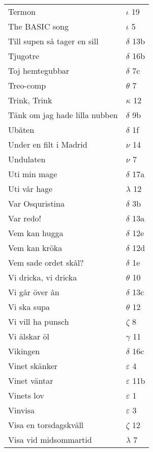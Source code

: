 \documentclass[a6paper,10pt]{article}
\begin{document}
\newpage
\begin{table}[!h]
\begin{tabular}{l l}
Termon&	$\iota$ 19\\
The BASIC song	&$\iota$ 5\\
Till supen så tager en sill	&$\delta$ 13b\\
Tjugotre	&$\delta$ 16b\\
Toj hemtegubbar	&$\delta$ 7c\\
Treo-comp	&$\theta$ 7\\
Trink, Trink&	$\kappa$ 12\\
Tänk om jag hade lilla nubben&	$\delta$ 9b\\
Ubåten	&$\delta$ 1f\\
Under en filt i Madrid	&$\nu$ 14\\
Undulaten&	$\nu$ 7\\
Uti min mage	&$\delta$ 17a\\
Uti vår hage	&$\lambda$ 12\\
Var Osquristina	&$\delta$ 3b\\
Var redo!	&$\delta$ 13a\\
Vem kan hugga	&$\delta$ 12e\\
Vem kan kröka	&$\delta$ 12d\\
Vem sade ordet skål?	&$\delta$ 1e\\
Vi dricka, vi dricka&	$\theta$ 10\\
Vi går över ån	&$\delta$ 13c\\
Vi ska supa	&$\theta$ 12\\
Vi vill ha punsch	&$\zeta$ 8\\
Vi älskar öl	&$\gamma$ 11\\
Vikingen	&$\delta$ 16c\\
Vinet skänker	&$\varepsilon$ 4\\
Vinet väntar	&$\varepsilon$ 11b\\
Vinets lov	&$\varepsilon$ 1\\
Vinvisa	&$\varepsilon$ 3\\
Visa en torsdagskväll	&$\zeta$ 12\\
Visa vid midsommartid &$\lambda$ 7\\
\end{tabular}
\end{table}
\newpage
\end{document}
